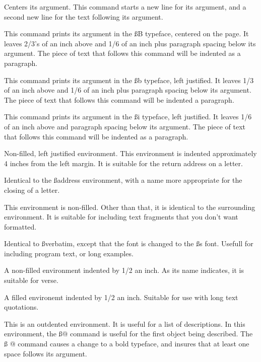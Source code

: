 {\describe

 Centers its argument. This command starts a new
line for its argument, and a second new line for the text
following its argument.

 This command prints its argument in the {\ss B}
typeface, centered on the page. It leaves 2/3's of an inch above
and 1/6 of an inch plus paragraph spacing below its argument. The
piece of text that follows this command will be indented as a paragraph.

 This command prints its argument in the {\ss b}
typeface, left justified. It leaves 1/3 of an inch above and 1/6
of an inch plus paragraph spacing below its argument. The piece
of text that follows this command will be indented a paragraph.

 This command prints its argument in the {\ss i}
typeface, left justified. It leaves 1/6 of an inch above and
paragraph spacing below its argument. The piece of text that
follows this command will be indented as a paragraph.

 Non-filled, left justified environment. This
environment is indented approximately 4 inches from the left
margin. It is suitable for the return address on a letter.

 Identical to the {\ss address} environment, with a
name more appropriate for the closing of a letter.

 This environment is non-filled. Other than that,
it is identical to the surrounding environment. It is suitable
for including text fragments that you don't want formatted.

 Identical to {\ss verbatim}, except that the font
is changed to the {\ss s} font. Usefull for including program
text, or long examples.

 A non-filled environment indented by 1/2 an inch. As
its name indicates, it is suitable for verse.

 A filled environemt indented by 1/2 an inch.
Suitable for use with long text quotations.

 This is an outdented environment. It is useful
for a list of descriptions. In this environment, the {\ss @}
command is useful for the first object being described. The {\ss
@} command causes a change to a bold typeface, and insures that
at least one space follows its argument.
}			%


